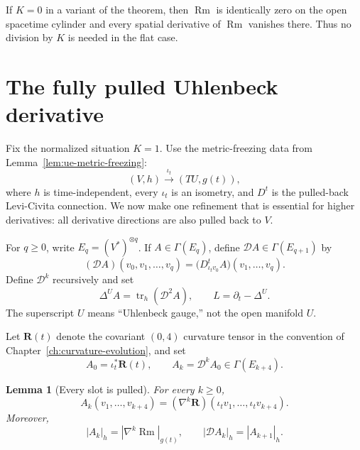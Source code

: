 \documentclass[10pt]{coll-l}
\newtheorem{lemma}[theorem]{Lemma}
\theoremstyle{definition}
\theoremstyle{remark}
\numberwithin{section}{chapter}
\numberwithin{equation}{chapter}
\newcommand{\Rm}{\operatorname{Rm}}
\begin{document}
If $K=0$ in a variant of the theorem, then $\Rm$ is identically zero on the
open spacetime cylinder and every spatial derivative of $\Rm$ vanishes
there.  Thus no division by $K$ is needed in the flat case.

\section{The fully pulled Uhlenbeck derivative}
\label{sec:shi-full-pullback}

Fix the normalized situation $K=1$.  Use the metric-freezing data from
Lemma~\ref{lem:ue-metric-freezing}:
\[
 (V,h)\xrightarrow{\ \iota_t\ }(TU,g(t)),
\]
where $h$ is time-independent, every $\iota_t$ is an isometry, and $D^t$ is
the pulled-back Levi-Civita connection.  We now make one refinement that is
essential for higher derivatives: all derivative directions are also pulled
back to $V$.

For $q\geq0$, write $E_q=(V^*)^{\otimes q}$.  If
$A\in\Gamma(E_q)$, define $\mathcal DA\in\Gamma(E_{q+1})$ by
\begin{equation}
 (\mathcal DA)(v_0,v_1,\ldots,v_q)
   =\bigl(D^t_{\iota_t v_0}A\bigr)(v_1,\ldots,v_q).       \label{eq:shi-full-D}
\end{equation}
Define $\mathcal D^k$ recursively and set
\begin{equation}
       \Delta^U A=\operatorname{tr}_h(\mathcal D^2A),
       \qquad L=\partial_t-\Delta^U.                     \label{eq:shi-fixed-heat-operator}
\end{equation}
The superscript $U$ means ``Uhlenbeck gauge,'' not the open manifold $U$.

Let $\mathbf R(t)$ denote the covariant $(0,4)$ curvature tensor in the
convention of Chapter~\ref{ch:curvature-evolution}, and set
\begin{equation}
 A_0=\iota_t^*\mathbf R(t),
 \qquad A_k=\mathcal D^kA_0\in\Gamma(E_{k+4}).            \label{eq:shi-Ak-definition}
\end{equation}

\begin{lemma}[Every slot is pulled]
\label{lem:shi-every-slot-pulled}
For every $k\geq0$,
\begin{equation}
 A_k(v_1,\ldots,v_{k+4})
  =(\nabla^k\mathbf R)
       (\iota_t v_1,\ldots,\iota_t v_{k+4}).             \label{eq:shi-Ak-naturality}
\end{equation}
Moreover,
\begin{equation}
 |A_k|_h=|\nabla^k\Rm|_{g(t)},
 \qquad |\mathcal DA_k|_h=|A_{k+1}|_h.                  \label{eq:shi-Ak-norm-bridge}
\end{equation}
\end{lemma}
\end{document}
